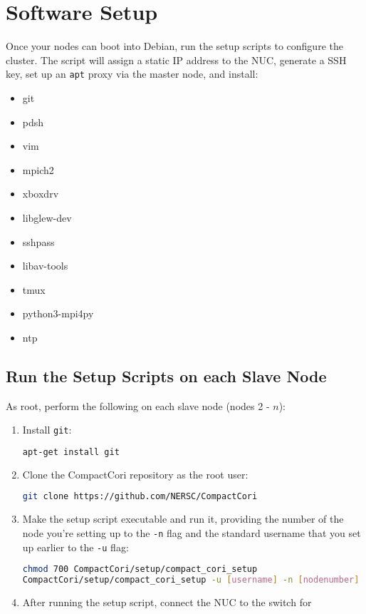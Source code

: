 \documentclass{article}
\begin{document}
\section{Software Setup}
    Once your nodes can boot into Debian, run the setup scripts to configure the
    cluster.  The script will assign a static IP address to the NUC, generate a
    SSH key, set up an \texttt{apt} proxy via the master node, and install:
    \begin{itemize}
        \item git
        \item pdsh
        \item vim
        \item mpich2
        \item xboxdrv
        \item libglew-dev
        \item sshpass
        \item libav-tools
        \item tmux
        \item python3-mpi4py
        \item ntp
    \end{itemize}
    \subsection{Run the Setup Scripts on each Slave Node}
    As root, perform the following on each slave node (nodes 2 - $n$):
        \begin{enumerate}
            \item Install \texttt{git}:\\
                \begin{lstlisting}[language=bash]
apt-get install git
                \end{lstlisting}

            \item Clone the CompactCori repository as the root user:\\
                \begin{lstlisting}[language=bash]
git clone https://github.com/NERSC/CompactCori
                \end{lstlisting}
            \item Make the setup script executable and run it, providing the number
                of the node you're setting up to the \texttt{-n} flag and the
                standard username that you set up earlier to the \texttt{-u} flag:
                \begin{lstlisting}[language=bash]
chmod 700 CompactCori/setup/compact_cori_setup
CompactCori/setup/compact_cori_setup -u [username] -n [nodenumber]
                \end{lstlisting}
            \item After running the setup script, connect the NUC to the switch for
        \end{enumerate}
\end{document}
